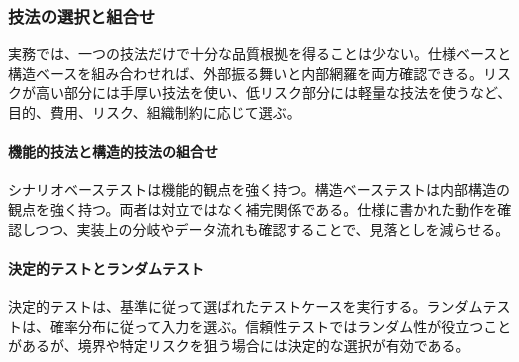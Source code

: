 \subsubsection{技法の選択と組合せ}
実務では、一つの技法だけで十分な品質根拠を得ることは少ない。仕様ベースと構造ベースを組み合わせれば、外部振る舞いと内部網羅を両方確認できる。リスクが高い部分には手厚い技法を使い、低リスク部分には軽量な技法を使うなど、目的、費用、リスク、組織制約に応じて選ぶ。

\paragraph{機能的技法と構造的技法の組合せ}
シナリオベーステストは機能的観点を強く持つ。構造ベーステストは内部構造の観点を強く持つ。両者は対立ではなく補完関係である。仕様に書かれた動作を確認しつつ、実装上の分岐やデータ流れも確認することで、見落としを減らせる。

\paragraph{決定的テストとランダムテスト}
決定的テストは、基準に従って選ばれたテストケースを実行する。ランダムテストは、確率分布に従って入力を選ぶ。信頼性テストではランダム性が役立つことがあるが、境界や特定リスクを狙う場合には決定的な選択が有効である。
